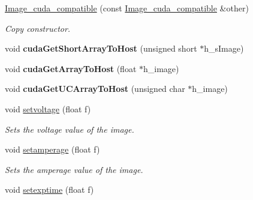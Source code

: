 \begin{DoxyCompactItemize}
\item 
\hyperlink{classImage__cuda__compatible_ac77e1c47ce391c2d9a8caff751c2ac76}{Image\+\_\+cuda\+\_\+compatible} (const \hyperlink{classImage__cuda__compatible}{Image\+\_\+cuda\+\_\+compatible} \&other)
\begin{DoxyCompactList}\small\item\em Copy constructor. \end{DoxyCompactList}\item 
void {\bfseries cuda\+Get\+Short\+Array\+To\+Host} (unsigned short $\ast$h\+\_\+s\+Image)\hypertarget{classImage__cuda__compatible_a01d69f35723a3a6100e0d16538c65d8d}{}\label{classImage__cuda__compatible_a01d69f35723a3a6100e0d16538c65d8d}

\item 
void {\bfseries cuda\+Get\+Array\+To\+Host} (float $\ast$h\+\_\+image)\hypertarget{classImage__cuda__compatible_a693f58d3c9fc76170fe214be6bf21c8f}{}\label{classImage__cuda__compatible_a693f58d3c9fc76170fe214be6bf21c8f}

\item 
void {\bfseries cuda\+Get\+U\+C\+Array\+To\+Host} (unsigned char $\ast$h\+\_\+image)\hypertarget{classImage__cuda__compatible_a7d89ef361f1aefb343c0a8fcea2e5b7d}{}\label{classImage__cuda__compatible_a7d89ef361f1aefb343c0a8fcea2e5b7d}

\item 
void \hyperlink{classImage__cuda__compatible_ac089291fbefec49650fc2b4fe1c8f6d9}{setvoltage} (float f)\hypertarget{classImage__cuda__compatible_ac089291fbefec49650fc2b4fe1c8f6d9}{}\label{classImage__cuda__compatible_ac089291fbefec49650fc2b4fe1c8f6d9}

\begin{DoxyCompactList}\small\item\em Sets the voltage value of the image. \end{DoxyCompactList}\item 
void \hyperlink{classImage__cuda__compatible_a4c4aee34c9aba24c807669a80b3c1805}{setamperage} (float f)\hypertarget{classImage__cuda__compatible_a4c4aee34c9aba24c807669a80b3c1805}{}\label{classImage__cuda__compatible_a4c4aee34c9aba24c807669a80b3c1805}

\begin{DoxyCompactList}\small\item\em Sets the amperage value of the image. \end{DoxyCompactList}\item 
void \hyperlink{classImage__cuda__compatible_a8679a17d852d7d6b009142ae2807c536}{setexptime} (float f)\hypertarget{classImage__cuda__compatible_a8679a17d852d7d6b009142ae2807c536}{}\label{classImage__cuda__compatible_a8679a17d852d7d6b009142ae2807c536}


\end{DoxyCompactItemize}
